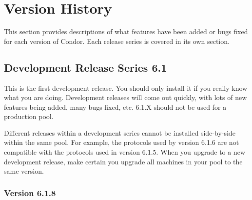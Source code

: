 \section{\label{sec:Version-History}Version History}

This section provides descriptions of what features have been added or
bugs fixed for each version of Condor.  
Each release series is covered in its own section.

\subsection{\label{sec:History-6-1}Development Release Series 6.1}

This is the first development release.
You should only install it if you really know what you are doing.
Development releases will come out quickly, with lots of new features
being added, many bugs fixed, etc.  
6.1.X should not be used for a production pool.

\Note Different releases within a development series cannot be
installed side-by-side within the same pool. 
For example, the protocols used by version 6.1.6 are not compatible with the
protocols used in version 6.1.5.  
When you upgrade to a new development release, make certain you upgrade all
machines in your pool to the same version.

\subsubsection{\label{sec:New-6-1-8}Version 6.1.8}

